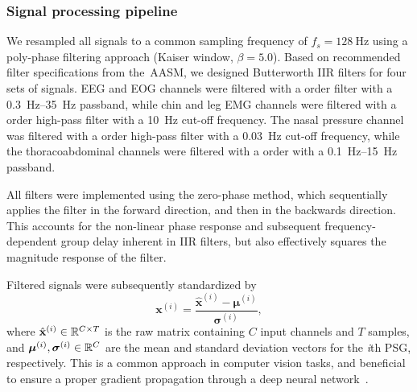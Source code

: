 

\subsubsection{Signal processing pipeline}
We resampled all signals to a common sampling frequency of $f_s = \SI{128}{\hertz}$ using a poly-phase filtering approach (Kaiser window, \( \beta = \num{5.0} \)).
Based on recommended filter specifications from the~\ac{AASM}, we designed Butterworth IIR filters for four sets of signals.
\Ac{EEG} and \ac{EOG} channels were filtered with a  order filter with a \SIrange[range-phrase=--]{0.3}{35}{\hertz} passband, while chin and leg \ac{EMG} channels were filtered with a  order high-pass filter with a \SI{10}{\hertz} cut-off frequency.
The nasal pressure channel was filtered with a  order high-pass filter with a \SI{0.03}{\hertz} cut-off frequency, while the thoracoabdominal channels were filtered with a  order with a \SIrange[range-phrase=--]{0.1}{15}{\hertz} passband.

All filters were implemented using the zero-phase method, which sequentially applies the filter in the forward direction, and then in the backwards direction.
This accounts for the non-linear phase response and subsequent frequency-dependent group delay inherent in IIR filters, but also effectively squares the magnitude response of the filter.

Filtered signals were subsequently standardized by
\begin{equation}
    \mathbf{x}^{(i)} = \frac{\hat{\mathbf{x}}^{(i)} - \boldsymbol{\mu}^{(i)}}{\boldsymbol{\sigma}^{(i)}},
\end{equation}
where $\hat{\mathbf{x}}^{(i)} \in \mathbb{R}^{C \times T}$ is the raw matrix containing $C$ input channels and $T$ samples, and $\boldsymbol{\mu}^{(i)}, \boldsymbol{\sigma}^{(i)} \in \mathbb{R}^{C}$ are the mean and standard deviation vectors for the \textit{i}th PSG, respectively.
This is a common approach in computer vision tasks, and beneficial to ensure a proper gradient propagation through a deep neural network~\cite{LeCun2012}.

